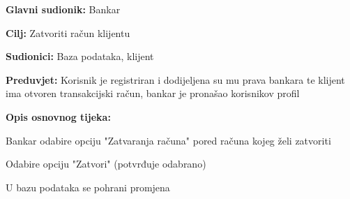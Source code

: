                 
                \noindent {}
                \begin{packed_item}
                
                  \item \textbf{Glavni sudionik: }Bankar
                  \item  \textbf{Cilj:} Zatvoriti račun klijentu
                  \item  \textbf{Sudionici:} Baza podataka, klijent
                  \item  \textbf{Preduvjet:} Korisnik je registriran i dodijeljena su mu prava bankara te klijent ima otvoren transakcijski račun, bankar je pronašao korisnikov profil
                  \item  \textbf{Opis osnovnog tijeka:}
                  
                  \item[] \begin{packed_enum}
                
                    \item Bankar odabire opciju "Zatvaranja računa" pored računa kojeg želi zatvoriti
                    \item Odabire opciju "Zatvori" (potvrđuje odabrano)                  
                    \item U bazu podataka se pohrani promjena
                  \end{packed_enum}
                 
                \end{packed_item}             
                            
